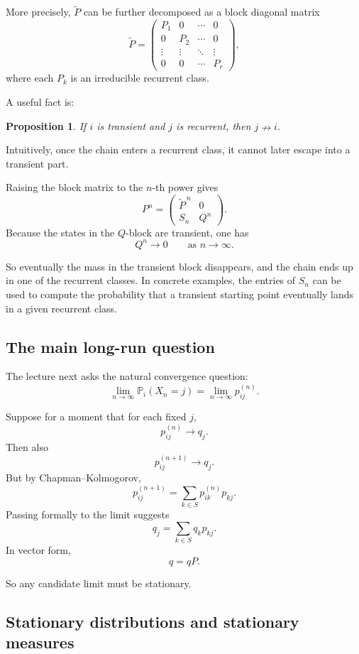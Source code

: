 \documentclass[11pt]{article}
\newtheorem{proposition}[theorem]{Proposition}
\theoremstyle{definition}
\begin{document}
More precisely, \(\widetilde P\) can be further decomposed as a block diagonal matrix
\[
\widetilde P=
\begin{pmatrix}
P_1 & 0 & \cdots & 0\\
0 & P_2 & \cdots & 0\\
\vdots & \vdots & \ddots & \vdots\\
0 & 0 & \cdots & P_r
\end{pmatrix},
\]
where each \(P_k\) is an irreducible recurrent class.

A useful fact is:

\begin{proposition}
If \(i\) is transient and \(j\) is recurrent, then \(j\nrightarrow i\).
\end{proposition}

Intuitively, once the chain enters a recurrent class, it cannot later escape into a transient part.

Raising the block matrix to the \(n\)-th power gives
\[
P^n=
\begin{pmatrix}
\widetilde P^{\,n} & 0\\
S_n & Q^n
\end{pmatrix}.
\]
Because the states in the \(Q\)-block are transient, one has
\[
Q^n\to 0
\qquad \text{as } n\to\infty.
\]

So eventually the mass in the transient block disappears, and the chain ends up in one of the recurrent classes. In concrete examples, the entries of \(S_n\) can be used to compute the probability that a transient starting point eventually lands in a given recurrent class.

\subsection{The main long-run question}

The lecture next asks the natural convergence question:
\[
\lim_{n\to\infty}\mathbb P_i(X_n=j)
=
\lim_{n\to\infty} p_{ij}^{(n)}.
\]

Suppose for a moment that for each fixed \(j\),
\[
p_{ij}^{(n)}\longrightarrow q_j.
\]
Then also
\[
p_{ij}^{(n+1)}\longrightarrow q_j.
\]
But by Chapman--Kolmogorov,
\[
p_{ij}^{(n+1)}
=
\sum_{k\in S} p_{ik}^{(n)}p_{kj}.
\]
Passing formally to the limit suggests
\[
q_j
=
\sum_{k\in S} q_k p_{kj}.
\]
In vector form,
\[
q=qP.
\]

So any candidate limit must be stationary.

\subsection{Stationary distributions and stationary measures}
\end{document}
